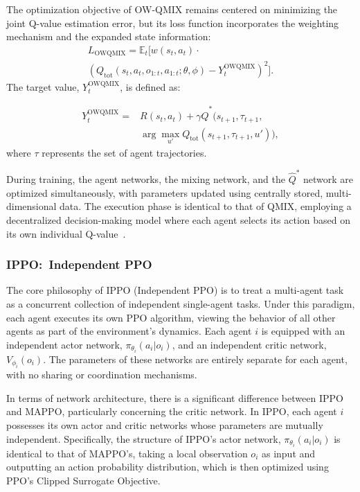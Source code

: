The optimization objective of OW-QMIX remains centered on minimizing the joint Q-value estimation error, but its loss function incorporates the weighting mechanism and the expanded state information:
\begin{multline}
    L_{\text{OWQMIX}} = \mathbb{E}_t\Big[ w(s_t, a_t) \cdot \\
    \left(Q_{\text{tot}}(s_t, a_t, o_{1:t}, a_{1:t}; \theta, \phi) - Y_t^{\text{OWQMIX}}\right)^{2} \Big].
\end{multline}
The target value, $Y_t^{\text{OWQMIX}}$, is defined as:

\begin{equation}
\begin{split}
    Y_t^{\text{OWQMIX}} ={}& R(s_t, a_t) + \gamma \hat{Q}^*\big(s_{t+1}, \tau_{t+1}, \\
    & \arg\max_{u'} Q_{\text{tot}}(s_{t+1}, \tau_{t+1}, u')\big),
\end{split}
\end{equation}
where $\tau$ represents the set of agent trajectories.

During training, the agent networks, the mixing network, and the $\hat{Q}^*$ network are optimized simultaneously, with parameters updated using centrally stored, multi-dimensional data. The execution phase is identical to that of QMIX, employing a decentralized decision-making model where each agent selects its action based on its own individual Q-value~\cite{rashidWeightedQMIXExpanding2020}.

\subsubsection{IPPO:~Independent PPO}

The core philosophy of IPPO (Independent PPO) is to treat a multi-agent task as a concurrent collection of independent single-agent tasks. Under this paradigm, each agent executes its own PPO algorithm, viewing the behavior of all other agents as part of the environment's dynamics. Each agent $i$ is equipped with an independent actor network, $\pi_{\theta_i}(a_i|o_i)$, and an independent critic network, $V_{\phi_i}(o_i)$. The parameters of these networks are entirely separate for each agent, with no sharing or coordination mechanisms.

In terms of network architecture, there is a significant difference between IPPO and MAPPO, particularly concerning the critic network. In IPPO, each agent $i$ possesses its own actor and critic networks whose parameters are mutually independent. Specifically, the structure of IPPO's actor network,
$
\pi_{\theta_i}(a_i|o_i)
$
is identical to that of MAPPO's, taking a local observation $o_i$ as input and outputting an action probability distribution, which is then optimized using PPO's Clipped Surrogate Objective.

